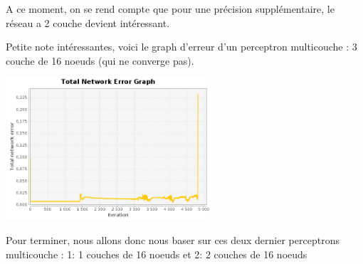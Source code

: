 \documentclass[10pt]{report}
\begin{document}
A ce moment, on se rend compte que pour une précision supplémentaire, le réseau a 2 couche devient intéressant.

Petite note intéressantes, voici le graph d'erreur d'un perceptron multicouche : 3 couche de 16 noeuds (qui ne converge pas).\\
\begin{center}
\includegraphics[height=200px]{img/SQUARE_16_16_16_101_-4.png}\\
\end{center}

Pour terminer, nous allons donc nous baser sur ces deux dernier perceptrons multicouche : 1: 1 couches de 16 noeuds et 2: 2 couches de 16 noeuds
\end{document}
